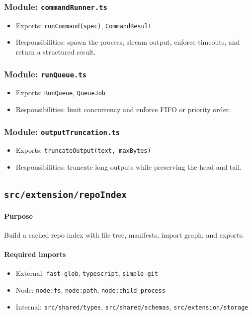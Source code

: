 \documentclass[11pt]{article}
\begin{document}
\subsubsection*{Module: \texttt{commandRunner.ts}}
\begin{itemize}[noitemsep]
  \item Exports: \texttt{runCommand(spec)}, \texttt{CommandResult}
  \item Responsibilities: spawn the process, stream output, enforce timeouts, and return a structured result.
\end{itemize}

\subsubsection*{Module: \texttt{runQueue.ts}}
\begin{itemize}[noitemsep]
  \item Exports: \texttt{RunQueue}, \texttt{QueueJob}
  \item Responsibilities: limit concurrency and enforce FIFO or priority order.
\end{itemize}

\subsubsection*{Module: \texttt{outputTruncation.ts}}
\begin{itemize}[noitemsep]
  \item Exports: \texttt{truncateOutput(text, maxBytes)}
  \item Responsibilities: truncate long outputs while preserving the head and tail.
\end{itemize}

\subsection{\texttt{src/extension/repoIndex}}
\paragraph{Purpose} Build a cached repo index with file tree, manifests, import graph, and exports.

\paragraph{Required imports}
\begin{itemize}[noitemsep]
  \item External: \texttt{fast-glob}, \texttt{typescript}, \texttt{simple-git}
  \item Node: \texttt{node:fs}, \texttt{node:path}, \texttt{node:child\_process}
  \item Internal: \texttt{src/shared/types}, \texttt{src/shared/schemas}, \texttt{src/extension/storage}
\end{itemize}
\end{document}
